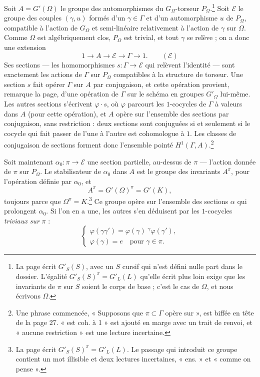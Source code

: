 \documentclass[11pt,a4paper]{article}
\begin{document}
Soit $A = G'(\Omega)$ le groupe des automorphismes du $G_{\Omega}$-torseur
$P_{\Omega}$.\footnote{La page écrit $G'_S(S)$, avec un $S$ cursif qui n'est
défini nulle part dans le dossier. L'égalité $G'_S(S)^{\pi} = G'_L(L)$ qu'elle
écrit plus loin exige que les invariants de $\pi$ sur $S$ soient le corps de
base ; c'est le cas de $\Omega$, et nous écrivons $\Omega$.} Soit
$\mathcal{E}$ le groupe des couples $(\gamma, u)$ formés d'un $\gamma \in
\Gamma$ et d'un automorphisme $u$ de $P_{\Omega}$, compatible à l'action de
$G_{\Omega}$ et semi-linéaire relativement à l'action de $\gamma$ sur $\Omega$.
Comme $\Omega$ est algébriquement clos, $P_{\Omega}$ est trivial, et tout
$\gamma$ se relève ; on a donc une extension
\[
1 \longrightarrow A \longrightarrow \mathcal{E} \longrightarrow \Gamma
\longrightarrow 1 . \qquad (\mathcal{E})
\]
Ses sections --- les homomorphismes $s : \Gamma \to \mathcal{E}$ qui
relèvent l'identité --- sont exactement les actions de $\Gamma$ sur
$P_{\Omega}$ compatibles à la structure de torseur. Une section $s$ fait
opérer $\Gamma$ sur $A$ par conjugaison, et cette opération provient,
remarque la page, d'une opération de $\Gamma$ sur le schéma en groupes
$G'_{\Omega}$ lui-même. Les autres sections s'écrivent $\varphi \cdot s$,
où $\varphi$ parcourt les $1$-cocycles de $\Gamma$ à valeurs dans $A$ (pour
cette opération), et $A$ opère sur l'ensemble des sections par conjugaison,
sans restriction : deux sections sont conjuguées si et seulement si le cocycle
qui fait passer de l'une à l'autre est cohomologue à $1$. Les classes de
conjugaison de sections forment donc l'ensemble pointé $H^1(\Gamma,
A)$.\footnote{Une phrase commencée, « Supposons que $\pi \subset \Gamma$
opère sur », est biffée en tête de la page 27. « est coh. à 1 » est ajouté en
marge avec un trait de renvoi, et « aucune restriction » est une lecture
incertaine.}

Soit maintenant $\alpha_0 : \pi \to \mathcal{E}$ une section partielle,
au-dessus de $\pi$ --- l'action donnée de $\pi$ sur $P_{\Omega}$. Le
stabilisateur de $\alpha_0$ dans $A$ est le groupe des invariants $A^{\pi}$,
pour l'opération définie par $\alpha_0$, et
\[
A^{\pi} = G'(\Omega)^{\pi} = G'(K),
\]
toujours parce que $\Omega^{\pi} = K$.\footnote{La page écrit $G'_S(S)^{\pi} =
G'_L(L)$. Le passage qui introduit ce groupe contient un mot illisible et deux
lectures incertaines, « ens. » et « comme on pense ».} Ce groupe opère sur
l'ensemble des sections $\alpha$ qui prolongent $\alpha_0$. Si l'on en a une,
les autres s'en déduisent par les $1$-cocycles \emph{triviaux sur} $\pi$ :
\[
\begin{cases}
\varphi(\gamma\gamma') = \varphi(\gamma)\; {}^{\gamma}\varphi(\gamma'), \\
\varphi(\gamma) = e \quad \text{pour } \gamma \in \pi .
\end{cases}
\]
\end{document}
